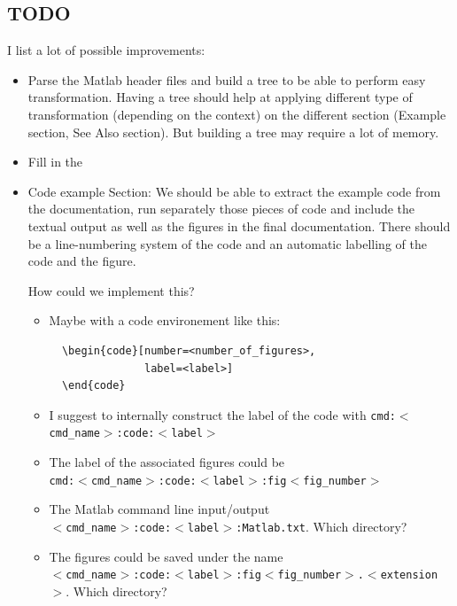 \documentclass[12pt,a4paper]{article}
\begin{document}
\subsection{TODO}
\label{sec:TODO}

I list a lot of possible improvements:
\begin{itemize}
\item Parse the Matlab header files and build a tree to be able to perform
  easy transformation.  Having a tree should help at applying different type
  of transformation (depending on the context) on the different section
  (Example section, See Also section).  But building a tree may require a
  lot of memory.
\item Fill in the 
\item Code example Section: We should be able to extract the example code
  from the documentation, run separately those pieces of code and include
  the textual output as well as the figures in the final documentation.
  There should be a line-numbering system of the code and an automatic
  labelling of the code and the figure.

  How could we implement this?
  \begin{itemize}
  \item Maybe with a code environement like this:
\begin{verbatim}
  \begin{code}[number=<number_of_figures>,
               label=<label>]
  \end{code}
\end{verbatim}
  \item I suggest to internally construct the label of the code with
    \texttt{cmd:$<$cmd\_name$>$:code:$<$label$>$}
  \item The label of the associated figures could be\\
    \texttt{cmd:$<$cmd\_name$>$:code:$<$label$>$:fig$<$fig\_number$>$}
  \item The Matlab command line input/output\\
    \texttt{$<$cmd\_name$>$:code:$<$label$>$:Matlab.txt}.  Which directory?
  \item The figures could be saved under the name\\
    \texttt{$<$cmd\_name$>$:code:$<$label$>$:fig$<$fig\_number$>$.$<$extension$>$}.
    Which directory?
  \end{itemize}

\end{itemize}
\end{document}
